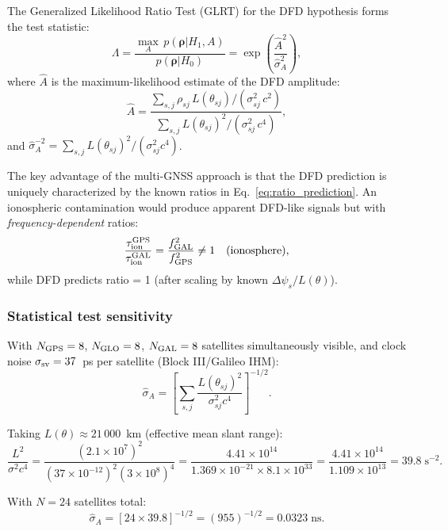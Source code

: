 \documentclass[aps,prd,twocolumn,superscriptaddress,nofootinbib]{revtex4-2}
\begin{document}
The Generalized Likelihood Ratio Test (GLRT) for the DFD hypothesis
forms the test statistic:
\begin{equation}
\Lambda = \frac{\max_A\, p(\boldsymbol{\rho} | H_1, A)}
  {p(\boldsymbol{\rho} | H_0)}
= \exp\!\left(\frac{\hat{A}^2}{\hat{\sigma}_A^2}\right),
\label{eq:GLRT}
\end{equation}
where $\hat{A}$ is the maximum-likelihood estimate of the DFD
amplitude:
\begin{equation}
\hat{A} = \frac{\sum_{s,j} \rho_{sj}\,L(\theta_{sj})/(\sigma_{sj}^2\,c^2)}
{\sum_{s,j} L(\theta_{sj})^2/(\sigma_{sj}^2\,c^4)},
\label{eq:A_MLE}
\end{equation}
and $\hat{\sigma}_A^{-2} = \sum_{s,j} L(\theta_{sj})^2/(\sigma_{sj}^2 c^4)$.

The key advantage of the multi-GNSS approach is that the DFD prediction
is uniquely characterized by the known ratios in Eq.~\eqref{eq:ratio_prediction}.
An ionospheric contamination would produce apparent DFD-like signals
but with \emph{frequency-dependent} ratios:
\begin{equation}
\frac{\tau_{\rm ion}^{\rm GPS}}{\tau_{\rm ion}^{\rm GAL}}
= \frac{f_{\rm GAL}^2}{f_{\rm GPS}^2}
\neq 1
\quad\text{(ionosphere)},
\end{equation}
while DFD predicts ratio = 1 (after scaling by known $\Delta\psi_s/L(\theta)$).

\subsubsection{Statistical test sensitivity}

With $N_{\rm GPS} = 8$, $N_{\rm GLO} = 8$, $N_{\rm GAL} = 8$ satellites
simultaneously visible, and clock noise $\sigma_{\rm sv} = 37$~ps per
satellite (Block III/Galileo IHM):
\begin{equation}
\hat{\sigma}_A = \left[\sum_{s,j}
\frac{L(\theta_{sj})^2}{\sigma_{sj}^2 c^4}\right]^{-1/2}.
\end{equation}

Taking $L(\theta) \approx 21\,000$~km (effective mean slant range):
\begin{equation}
\frac{L^2}{\sigma^2 c^4} = \frac{(2.1\times10^7)^2}{(37\times10^{-12})^2(3\times10^8)^4}
= \frac{4.41\times10^{14}}{1.369\times10^{-21}\times8.1\times10^{33}}
= \frac{4.41\times10^{14}}{1.109\times10^{13}}
= 39.8\;\text{s}^{-2}.
\end{equation}

With $N = 24$ satellites total:
\begin{equation}
\hat{\sigma}_A = \left[24\times39.8\right]^{-1/2}
= (955)^{-1/2} = 0.0323\;\text{ns}.
\end{equation}
\end{document}
